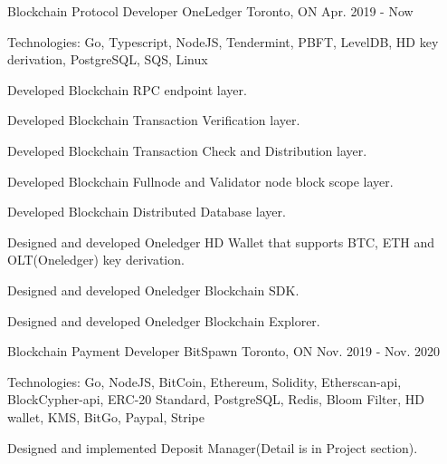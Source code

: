 \vspace{-2.0em}
\begin{cventries}
    \cventry
    {Blockchain Protocol Developer}
    {OneLedger}
    {Toronto, ON}
    {Apr. 2019 - Now}
    {
      \begin{cvitems}
        \item {Technologies: Go, Typescript, NodeJS, Tendermint, PBFT, LevelDB, HD key derivation, PostgreSQL, SQS, Linux}
        \item {Developed Blockchain RPC endpoint layer.}
        \item {Developed Blockchain Transaction Verification layer.}
        \item {Developed Blockchain Transaction Check and Distribution layer.}
        \item {Developed Blockchain Fullnode and Validator node block scope layer.}
        \item {Developed Blockchain Distributed Database layer.}
        \item {Designed and developed Oneledger HD Wallet that supports BTC, ETH and OLT(Oneledger) key derivation.}
        \item {Designed and developed Oneledger Blockchain SDK.}
        \item {Designed and developed Oneledger Blockchain Explorer.}
      \end{cvitems}
    }
    
    \cventry
    {Blockchain Payment Developer}
    {BitSpawn}
    {Toronto, ON}
    {Nov. 2019 - Nov. 2020}
    {
      \begin{cvitems}
        \item {Technologies: Go, NodeJS, BitCoin, Ethereum, Solidity, Etherscan-api, BlockCypher-api, ERC-20 Standard, PostgreSQL, Redis, Bloom Filter, HD wallet, KMS, BitGo, Paypal, Stripe}
        \item {Designed and implemented Deposit Manager(Detail is in Project section).}
      \end{cvitems}
    }


\end{cventries}
